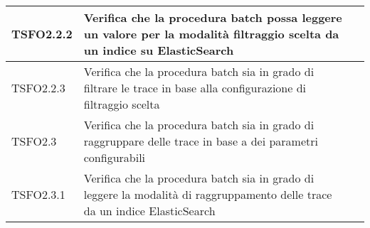 \begin{center}
\begin{longtable}{ | >{\centering\arraybackslash}m{2.5cm} | >{\raggedright\arraybackslash}m{9cm} | >{\centering\arraybackslash}m{3.5cm} | }
				TSFO2.2.2 & Verifica che la procedura batch possa leggere un valore per la modalità ﬁltraggio scelta da un indice su ElasticSearch

							& \donetext{} \\ \hline
							
				TSFO2.2.3 & Verifica che la procedura batch sia in grado di filtrare le trace in base alla
							configurazione di filtraggio scelta
							& \donetext{} \\ \hline
				TSFO2.3 & Verifica che la procedura batch sia in grado di raggruppare 
							delle trace in base a dei parametri configurabili
						& \donetext{} \\ \hline
				TSFO2.3.1 & Verifica che la procedura batch sia in grado di leggere la modalità di raggruppamento
							delle trace da un indice ElasticSearch
						& \donetext{} \\ \hline
						

\end{longtable}
\end{center}
